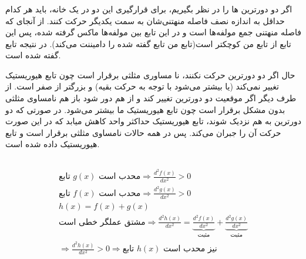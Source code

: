\documentclass{university}
\begin{document}
\subsubsection{}
اگر دو دورترین 
ها 
را در نظر بگیریم، برای قرارگیری این دو در یک خانه، باید هر کدام حداقل به اندازه نصف فاصله منهتنی‌شان به سمت 
یکدیگر حرکت کنند. از آنجای که فاصله منهتنی جمع مولفه‌ها است و در این تابع بین مولفه‌ها ماکس گرفته شده، 
پس این تابع از تابع من کوچکتر است(تابع من تابع گفته شده را دامیننت می‌کند). در نتیجه 
تابع گفته شده 
است. 

حال اگر دو دورترین
حرکت نکنند، نا مساوری مثلثی برقرار است چون تابع هیوریستیک تغییر نمی‌کند (یا بیشتر می‌شود با توجه به حرکت بقیه) و 
بزرگتر از صفر است. از طرف دیگر اگر موقعیت دو دورترین تغییر کند و از هم دور شود باز هم نامساوی 
مثلثی بدون مشکل برقرار است چون تابع هیوریستیک ما بیشتر می‌شود. 
در صورتی که دو دورترین 
به هم نزدیک شوند، تابع هیوریستیک حداکثر 
واحد کاهش میابد که در این صورت 
حرکت آن را جبران می‌کند. پس در همه حالات نامساوی مثلثی برقرار است و 
تابع هیوریستیک داده شده 
است. 

\subsection{}
\subsubsection{}
\begin{gather*}
    \text{تابع $g(x)$ محدب است} \Rightarrow \frac{d^2 f(x)}{d x^2} > 0 \\
    \text{تابع $f(x)$ محدب است} \Rightarrow \frac{d^2 g(x)}{d x^2} > 0 \\
    h(x) = f(x) + g(x) \\
    \text{مشتق عملگر خطی است} \Rightarrow \frac{d^2 h(x)}{d x^2} = \underbrace{\frac{d^2 f(x)}{d x^2}}_{\text{مثبت}} + \underbrace{\frac{d^2 g(x)}{d x^2}}_{\text{مثبت}} \\
    \Rightarrow \frac{d^2 h(x)}{d x^2} > 0 \Rightarrow \text{تابع $h(x)$ نیز محدب است}
\end{gather*}
\end{document}
